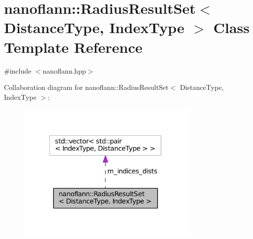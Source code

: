 \hypertarget{classnanoflann_1_1_radius_result_set}{\section{nanoflann\-:\-:Radius\-Result\-Set$<$ Distance\-Type, Index\-Type $>$ Class Template Reference}
\label{classnanoflann_1_1_radius_result_set}
}


{\ttfamily \#include $<$nanoflann.\-hpp$>$}



Collaboration diagram for nanoflann\-:\-:Radius\-Result\-Set$<$ Distance\-Type, Index\-Type $>$\-:\nopagebreak
\begin{figure}[H]
\begin{center}
\leavevmode
\includegraphics[width=248pt]{classnanoflann_1_1_radius_result_set__coll__graph}
\end{center}
\end{figure}
